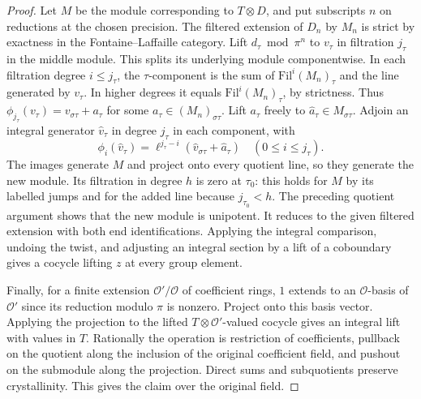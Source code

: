 \documentclass[a4paper,11pt]{article}
\theoremstyle{definition}
\theoremstyle{remark}
\numberwithin{equation}{section}
\begin{document}
\begin{proof}
Let \(M\) be the module corresponding to \(T\otimes D\), and
put subscripts \(n\) on reductions at the chosen precision.
The filtered extension of \(D_n\) by \(M_n\) is strict by exactness
in the Fontaine--Laffaille category. Lift \(d_\tau\bmod\pi^n\) to
\(v_\tau\) in filtration \(j_\tau\) in the middle module.
This splits its underlying module componentwise. In each filtration
degree \(i\le j_\tau\), the \(\tau\)-component is the sum of
\(\mathrm{Fil}^i(M_n)_\tau\) and the line generated by \(v_\tau\).
In higher degrees it equals \(\mathrm{Fil}^i(M_n)_\tau\), by
strictness. Thus
\(\phi_{j_\tau}(v_\tau)=v_{\sigma\tau}+a_\tau\) for some
\(a_\tau\in(M_n)_{\sigma\tau}\).
Lift \(a_\tau\) freely to \(\widehat a_\tau\in M_{\sigma\tau}\).
Adjoin an integral generator \(\widehat v_\tau\) in degree
\(j_\tau\) in each component, with
\[
 \phi_i(\widehat v_\tau)=
       \ell^{j_\tau-i}(\widehat v_{\sigma\tau}+\widehat a_\tau)
                                   \quad(0\le i\le j_\tau).
\]
The images generate \(M\) and project onto every quotient line,
so they generate the new module. Its filtration in degree \(h\)
is zero at \(\tau_0\): this holds for \(M\) by its labelled
jumps and for the added line because \(j_{\tau_0}<h\).
The preceding quotient argument shows that the new module is
unipotent. It reduces to the given filtered extension with both
end identifications. Applying the integral comparison, undoing
the twist, and adjusting an integral section by a lift of a
coboundary gives a cocycle lifting \(z\) at every group element.

Finally, for a finite extension \(\mathcal O'/\mathcal O\) of
coefficient rings, \(1\) extends to an \(\mathcal O\)-basis of
\(\mathcal O'\) since its reduction modulo \(\pi\) is nonzero.
Project onto this basis vector. Applying the projection to the
lifted \(T\otimes\mathcal O'\)-valued cocycle gives an integral
lift with values in \(T\). Rationally the operation is restriction
of coefficients, pullback on the quotient along the inclusion
of the original coefficient field, and pushout on the submodule
along the projection. Direct sums and subquotients preserve
crystallinity. This gives the claim over the original field.
\end{proof}
\end{document}
